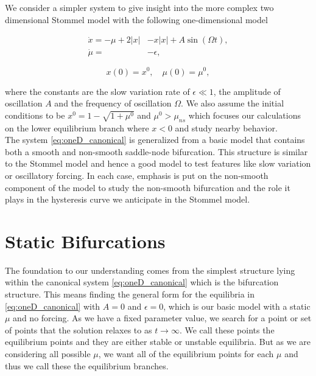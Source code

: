 We consider a simpler system to give insight into the more complex two dimensional Stommel model with the following one-dimensional model

\begin{equation}\label{eq:oneD_canonical}
\begin{aligned}
\dot{x}=-\mu+2|x|&-x|x|+A\sin(\Omega t),\\
\dot{\mu}=&-\epsilon,
\end{aligned}
\end{equation}

\begin{equation*}
x(0)=x^0,\quad\mu(0)=\mu^0,
\end{equation*}

where the constants are the slow variation rate of $\epsilon \ll 1$, the amplitude of oscillation $A$ and the frequency of oscillation $\Omega$. We also assume the initial conditions to be ${x^0=1-\sqrt{1+\mu^0}}$ and $\mu^0>\mu_{ns}$ which focuses our calculations on the lower equilibrium branch where $x<0$ and study nearby behavior.\\
The system \eqref{eq:oneD_canonical} is generalized from a basic model that contains both a smooth and non-smooth saddle-node bifurcation. This structure is similar to the Stommel model and hence a good model to test features like slow variation or oscillatory forcing. In each case, emphasis is put on the non-smooth component of the model to study the non-smooth bifurcation and the role it plays in the hysteresis curve we anticipate in the Stommel model.

\section{Static Bifurcations}
\label{sec:oneD_static}

The foundation to our understanding comes from the simplest structure lying within the canonical system \eqref{eq:oneD_canonical} which is the bifurcation structure. This means finding the general form for the equilibria in \eqref{eq:oneD_canonical} with $A=0$ and $\epsilon=0$, which is our basic model with a static $\mu$ and no forcing. As we have a fixed parameter value, we search for a point or set of points that the solution relaxes to as $t\to \infty$. We call these points the equilibrium points and they are either stable or unstable equilibria. But as we are considering all possible $\mu$, we want all of the equilibrium points for each $\mu$ and thus we call these the equilibrium branches.

